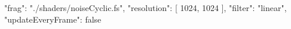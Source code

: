 {
	"frag": "./shaders/noiseCyclic.fs",
	"resolution": [
		1024,
		1024
	],
	"filter": "linear",
	"updateEveryFrame": false
}
